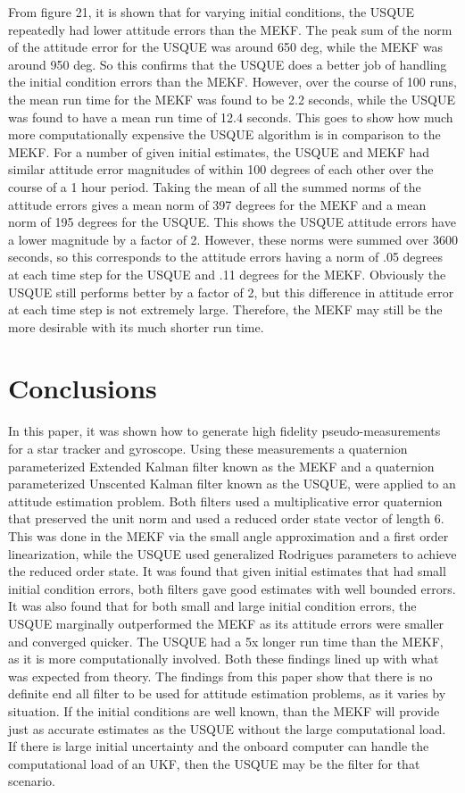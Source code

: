 \documentclass[12pt]{report}
\begin{document}
\noindent From figure 21, it is shown that for varying initial conditions, the USQUE repeatedly had lower attitude errors than the MEKF. The peak sum of the norm of the attitude error for the USQUE was around 650 deg, while the MEKF was around 950 deg. So this confirms that the USQUE does a better job of handling the initial condition errors than the MEKF. However, over the course of 100 runs, the mean run time for the MEKF was found to be 2.2 seconds, while the USQUE was found to have a mean run time of 12.4 seconds. This goes to show how much more computationally expensive the USQUE algorithm is in comparison to the MEKF. For a number of given initial estimates, the USQUE and MEKF had similar attitude error magnitudes of within 100 degrees of each other over the course of a 1 hour period. Taking the mean of all the summed norms of the attitude errors gives a mean norm of 397 degrees for the MEKF and a mean norm of 195 degrees for the USQUE. This shows the USQUE attitude errors have a lower magnitude by a factor of 2. However, these norms were summed over 3600 seconds, so this corresponds to the attitude errors having a norm of .05 degrees at each time step for the USQUE and .11 degrees for the MEKF. Obviously the USQUE still performs better by a factor of 2, but this difference in attitude error at each time step is not extremely large. Therefore, the MEKF may still be the more desirable with its much shorter run time.  

\section*{Conclusions }
\noindent In this paper, it was shown how to generate high fidelity pseudo-measurements for a star tracker and gyroscope. Using these measurements a quaternion parameterized Extended Kalman filter known as the MEKF and a quaternion parameterized Unscented Kalman filter known as the USQUE, were applied to an attitude estimation problem. Both filters used a multiplicative error quaternion that preserved the unit norm and used a reduced order state vector of length 6. This was done in the MEKF via the small angle approximation and a first order linearization, while the USQUE used generalized Rodrigues parameters to achieve the reduced order state. It was found that given initial estimates that had small initial condition errors, both filters gave good estimates with well bounded errors. It was also found that for both small and large initial condition errors, the USQUE marginally outperformed the MEKF as its attitude errors were smaller and converged quicker. The USQUE had a 5x longer run time than the MEKF, as it is more computationally involved. Both these findings lined up with what was expected from theory. The findings from this paper show that there is no definite end all filter to be used for attitude estimation problems, as it varies by situation. If the initial conditions are well known, than the MEKF will provide just as accurate estimates as the USQUE without the large computational load. If there is large initial uncertainty and the onboard computer can handle the computational load of an UKF, then the USQUE may be the filter for that scenario. 
\end{document}
